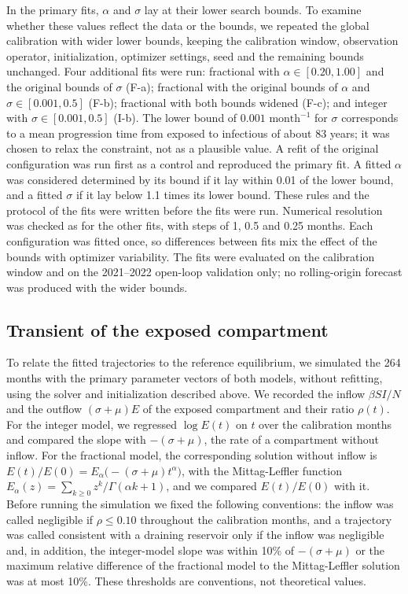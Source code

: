 \documentclass[pdflatex,sn-mathphys-ay,lineno]{sn-jnl}
\begin{document}
In the primary fits, $\alpha$ and $\sigma$ lay at their lower search bounds. To examine whether these values reflect the data or the bounds, we repeated the global calibration with wider lower bounds, keeping the calibration window, observation operator, initialization, optimizer settings, seed and the remaining bounds unchanged. Four additional fits were run: fractional with $\alpha\in[0.20,1.00]$ and the original bounds of $\sigma$ (F-a); fractional with the original bounds of $\alpha$ and $\sigma\in[0.001,0.5]$ (F-b); fractional with both bounds widened (F-c); and integer with $\sigma\in[0.001,0.5]$ (I-b). The lower bound of $0.001\text{ month}^{-1}$ for $\sigma$ corresponds to a mean progression time from exposed to infectious of about 83 years; it was chosen to relax the constraint, not as a plausible value. A refit of the original configuration was run first as a control and reproduced the primary fit. A fitted $\alpha$ was considered determined by its bound if it lay within 0.01 of the lower bound, and a fitted $\sigma$ if it lay below 1.1 times its lower bound. These rules and the protocol of the fits were written before the fits were run. Numerical resolution was checked as for the other fits, with steps of 1, 0.5 and 0.25 months. Each configuration was fitted once, so differences between fits mix the effect of the bounds with optimizer variability. The fits were evaluated on the calibration window and on the 2021--2022 open-loop validation only; no rolling-origin forecast was produced with the wider bounds.

\subsection{Transient of the exposed compartment}\label{sec:transmethods}

To relate the fitted trajectories to the reference equilibrium, we simulated the 264 months with the primary parameter vectors of both models, without refitting, using the solver and initialization described above. We recorded the inflow $\beta SI/N$ and the outflow $(\sigma+\mu)E$ of the exposed compartment and their ratio $\rho(t)$. For the integer model, we regressed $\log E(t)$ on $t$ over the calibration months and compared the slope with $-(\sigma+\mu)$, the rate of a compartment without inflow. For the fractional model, the corresponding solution without inflow is $E(t)/E(0)=E_\alpha\bigl(-(\sigma+\mu)t^\alpha\bigr)$, with the Mittag-Leffler function $E_\alpha(z)=\sum_{k\ge0}z^k/\Gamma(\alpha k+1)$, and we compared $E(t)/E(0)$ with it. Before running the simulation we fixed the following conventions: the inflow was called negligible if $\rho\le0.10$ throughout the calibration months, and a trajectory was called consistent with a draining reservoir only if the inflow was negligible and, in addition, the integer-model slope was within 10\% of $-(\sigma+\mu)$ or the maximum relative difference of the fractional model to the Mittag-Leffler solution was at most 10\%. These thresholds are conventions, not theoretical values.
\end{document}
